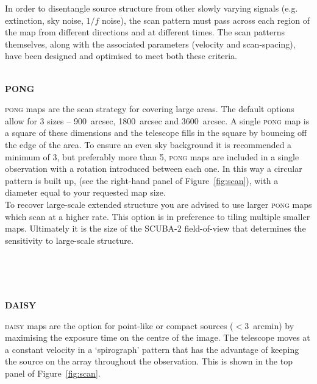 \documentclass[twoside,11pt]{article}
\newcommand{\htmlref}[2]{#1}
\newcommand{\latexhtml}[2]{#1}
\renewcommand{\_}{\texttt{\symbol{95}}}
\newcommand{\cref}[3]{\latexhtml{#1~\ref{#2}}{\htmlref{#3}{#2}}}
\begin{document}
In order to disentangle source structure from other
slowly varying signals (e.g. extinction, sky noise, $1/f$ noise), the
scan pattern must pass across each region of the map from different
directions and at different times. The scan patterns themselves, along
with the associated parameters (velocity and scan-spacing), have been
designed and optimised to meet both these criteria.
\\ \\
\begin{minipage}[t]{0.12\linewidth}
\textbf{PONG}
\end{minipage}
\begin{minipage}[t]{0.85\linewidth}\textsc{pong} maps are the scan
strategy for covering large areas. The default options allow for 3
sizes -- 900~arcsec, 1800~arcsec and 3600~arcsec. A single \textsc{pong} map is
a square of these dimensions and the telescope fills in the square by
bouncing off the edge of the area. To ensure an even sky background it
is recommended a minimum of 3, but preferably more than 5,
\textsc{pong} maps are included in a single observation with a
rotation introduced between each one. In this way a circular pattern
is built up, (see the right-hand panel of \cref{Figure}{fig:scan}{graphic below}),
with a diameter equal to your requested map size.
\vspace{0.2cm}\\
To recover large-scale extended structure you are advised to use
larger \textsc{pong} maps which scan at a higher rate. This option is
in preference to tiling multiple smaller maps. Ultimately it is the
size of the SCUBA-2 field-of-view that determines the sensitivity to
large-scale structure.
\end{minipage}
\\ \\ \\
\begin{minipage}[t]{0.12\linewidth}
\textbf{DAISY}
\end{minipage}
\begin{minipage}[t]{0.85\linewidth}
\textsc{daisy} maps are the option for point-like or compact sources
($<$3~arcmin) by maximising the exposure time on the centre of the
image. The telescope moves at a constant velocity in a `spirograph'
pattern that has the advantage of keeping the source on the array
throughout the observation. This is shown in the top panel of
\cref{Figure}{fig:scan}{the figure below}.
\end{minipage}
\end{document}
